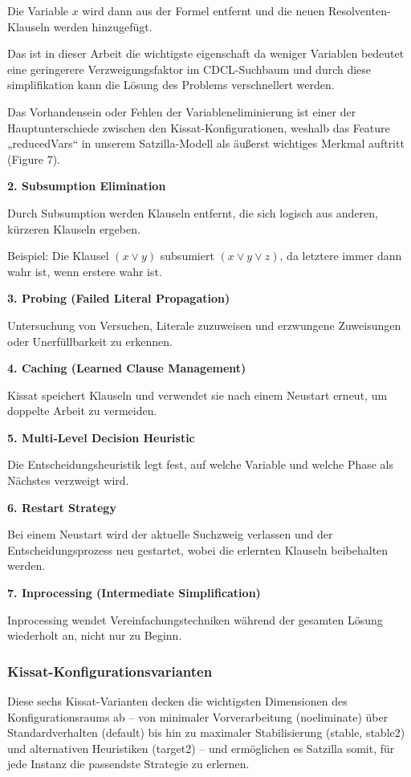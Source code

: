 Die Variable \(x\) wird dann aus der Formel entfernt und die neuen Resolventen-Klauseln werden hinzugefügt.

Das ist in dieser Arbeit die wichtigste eigenschaft da weniger Variablen bedeutet eine geringerere 
Verzweigungsfaktor im CDCL-Suchbaum und durch diese simplifikation kann die Lösung des Problems verschnellert
werden.

Das Vorhandensein oder Fehlen der Variableneliminierung ist einer der Hauptunterschiede zwischen den 
Kissat-Konfigurationen, weshalb das Feature „reducedVars“ in unserem Satzilla-Modell als äußerst 
wichtiges Merkmal auftritt (Figure 7).

\textbf{2. Subsumption Elimination}

Durch Subsumption werden Klauseln entfernt, die sich logisch aus anderen, kürzeren Klauseln ergeben.

Beispiel: Die Klausel \((x \lor y)\) subsumiert \((x \lor y \lor z)\), da letztere immer dann wahr ist, wenn erstere wahr ist.

\textbf{3. Probing (Failed Literal Propagation)}

Untersuchung von Versuchen, Literale zuzuweisen und erzwungene Zuweisungen oder Unerfüllbarkeit zu erkennen.

\textbf{4. Caching (Learned Clause Management)}

Kissat speichert Klauseln und verwendet sie nach einem Neustart erneut, um doppelte Arbeit zu vermeiden.

\textbf{5. Multi‑Level Decision Heuristic}

Die Entscheidungsheuristik legt fest, auf welche Variable und welche Phase als Nächstes verzweigt wird.

\textbf{6. Restart Strategy}

Bei einem Neustart wird der aktuelle Suchzweig verlassen und der Entscheidungsprozess neu gestartet, 
wobei die erlernten Klauseln beibehalten werden.

\textbf{7. Inprocessing (Intermediate Simplification)}

Inprocessing wendet Vereinfachungstechniken während der gesamten Lösung wiederholt an, nicht nur zu Beginn.

\newpage

\subsubsection{Kissat-Konfigurationsvarianten}

Diese sechs Kissat-Varianten decken die wichtigsten Dimensionen des Konfigurationsraums ab – von 
minimaler Vorverarbeitung (noeliminate) über Standardverhalten (default) bis hin zu maximaler 
Stabilisierung (stable, stable2) und alternativen Heuristiken (target2) – und ermöglichen es 
Satzilla somit, für jede Instanz die passendste Strategie zu erlernen.\cite{biere2020kissat}

